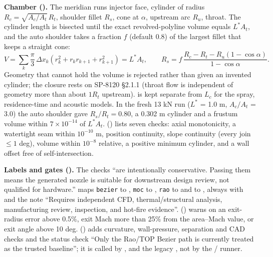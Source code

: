 \textbf{Chamber ().} The meridian runs injector face, cylinder of radius
$R_c = \sqrt{A_c/A_t}\,R_t$, shoulder fillet $R_s$, cone at $\alpha$, upstream arc $R_u$, throat. The cylinder
length is bisected until the exact revolved-polyline volume equals $L^*A_t$, and the auto shoulder takes a
fraction $f$ (default 0.8) of the largest fillet that keeps a straight cone:
\begin{equation}
V = \sum_k \frac{\pi}{3}\,\Delta x_k\left(r_k^2 + r_k r_{k+1} + r_{k+1}^2\right) = L^* A_t,
\qquad
R_s = f\,\frac{R_c - R_t - R_u(1-\cos\alpha)}{1-\cos\alpha}.
\end{equation}
Geometry that cannot hold the volume is rejected rather than given an invented cylinder; the closure rests on
SP-8120 \S2.1.1 (throat flow is independent of geometry more than about $1R_t$ upstream).
 is kept separate from $L_c$ for the spray, residence-time and acoustic models.
In the fresh 13 kN run ($L^*$ = 1.0 m, $A_c/A_t$ = 3.0) the auto shoulder gave $R_s/R_t = 0.80$, a 0.302 m
cylinder and a frustum volume within $7\times10^{-14}$ of $L^*A_t$.
 () lists seven checks: axial monotonicity, a watertight
seam within $10^{-10}$ m, position continuity, slope continuity (every join $\le 1$ deg), volume within
$10^{-8}$ relative, a positive minimum cylinder, and a wall offset free of self-intersection.

\textbf{Labels and gates ().} The checks ``are intentionally conservative. Passing them
means the generated nozzle is suitable for downstream design review, not qualified for hardware.''
 maps \texttt{bezier} to , \texttt{moc} to
, \texttt{rao} to  and
 to , always with
 and the note ``Requires independent CFD, thermal/structural analysis,
manufacturing review, inspection, and hot-fire evidence''. 
() warns on an exit-radius error above 0.5\%, exit Mach more than 25\% from the area--Mach value, or
exit angle above 10 deg.  () adds curvature, wall-pressure, separation
and CAD checks and the status check ``Only the Rao/TOP Bezier path is currently treated as the trusted
baseline''; it is called by ,  and the legacy
, not by the / runner.

